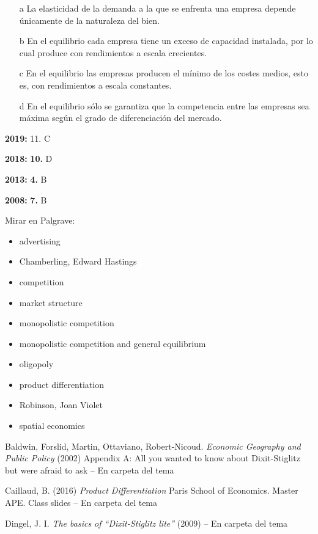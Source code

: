 \documentclass{nuevotema}
\begin{document}
\begin{itemize}
	\item[a] La elasticidad de la demanda a la que se enfrenta una empresa depende únicamente de la naturaleza del bien.
	\item[b] En el equilibrio cada empresa tiene un exceso de capacidad instalada, por lo cual produce con rendimientos a escala crecientes.
	\item[c] En el equilibrio las empresas producen el mínimo de los costes medios, esto es, con rendimientos a escala constantes.
	\item[d] En el equilibrio sólo se garantiza que la competencia entre las empresas sea máxima según el grado de diferenciación del mercado.
\end{itemize}

\notas

\textbf{2019:} 11. C

\textbf{2018:} \textbf{10.} D

\textbf{2013:} \textbf{4.} B

\textbf{2008:} \textbf{7.} B

\bibliografia

Mirar en Palgrave:

\begin{itemize}
	\item advertising
	\item Chamberling, Edward Hastings
	\item competition
	\item market structure
	\item monopolistic competition
	\item monopolistic competition and general equilibrium
	\item oligopoly
	\item product differentiation
	\item Robinson, Joan Violet
	\item spatial economics
\end{itemize}


Baldwin, Forslid, Martin, Ottaviano, Robert-Nicoud. \textit{Economic Geography and Public Policy} (2002) Appendix A: All you wanted to know about Dixit-Stiglitz but were afraid to ask -- En carpeta del tema

Caillaud, B. (2016) \textit{Product Differentiation} Paris School of Economics. Master APE. Class slides -- En carpeta del tema

Dingel, J. I. \textit{The basics of ``Dixit-Stiglitz lite''} (2009) -- En carpeta del tema
\end{document}
